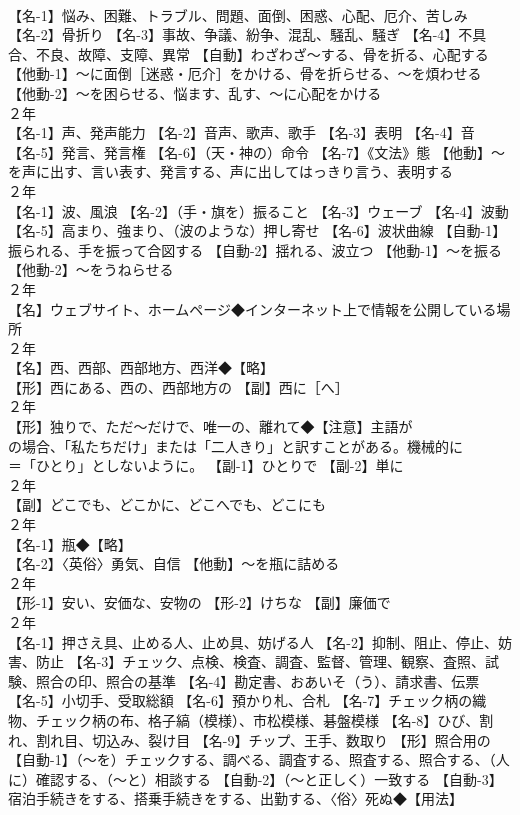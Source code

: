 \documentclass[8pt]{extreport}
\begin{document}
\begin{CJK}{UTF8}{min}
\\	【名-1】悩み、困難、トラブル、問題、面倒、困惑、心配、厄介、苦しみ 【名-2】骨折り 【名-3】事故、争議、紛争、混乱、騒乱、騒ぎ 【名-4】不具合、不良、故障、支障、異常 【自動】わざわざ～する、骨を折る、心配する 【他動-1】～に面倒［迷惑・厄介］をかける、骨を折らせる、～を煩わせる 【他動-2】～を困らせる、悩ます、乱す、～に心配をかける
\\	２年	
\\	【名-1】声、発声能力 【名-2】音声、歌声、歌手 【名-3】表明 【名-4】音 【名-5】発言、発言権 【名-6】（天・神の）命令 【名-7】《文法》態 【他動】～を声に出す、言い表す、発言する、声に出してはっきり言う、表明する
\\	２年	
\\	【名-1】波、風浪 【名-2】（手・旗を）振ること 【名-3】ウェーブ 【名-4】波動 【名-5】高まり、強まり、（波のような）押し寄せ 【名-6】波状曲線 【自動-1】振られる、手を振って合図する 【自動-2】揺れる、波立つ 【他動-1】～を振る 【他動-2】～をうねらせる
\\	２年	
\\	【名】ウェブサイト、ホームページ◆インターネット上で情報を公開している場所
\\	２年	
\\	【名】西、西部、西部地方、西洋◆【略】
\\	【形】西にある、西の、西部地方の 【副】西に［へ］
\\	２年	
\\	【形】独りで、ただ～だけで、唯一の、離れて◆【注意】主語が 
\\	の場合、「私たちだけ」または「二人きり」と訳すことがある。機械的に 
\\	＝「ひとり」としないように。 【副-1】ひとりで 【副-2】単に
\\	２年	
\\	【副】どこでも、どこかに、どこへでも、どこにも
\\	２年	
\\	【名-1】瓶◆【略】
\\	【名-2】〈英俗〉勇気、自信 【他動】～を瓶に詰める
\\	２年	
\\	【形-1】安い、安価な、安物の 【形-2】けちな 【副】廉価で
\\	２年	
\\	【名-1】押さえ具、止める人、止め具、妨げる人 【名-2】抑制、阻止、停止、妨害、防止 【名-3】チェック、点検、検査、調査、監督、管理、観察、査照、試験、照合の印、照合の基準 【名-4】勘定書、おあいそ（う）、請求書、伝票 【名-5】小切手、受取総額 【名-6】預かり札、合札 【名-7】チェック柄の織物、チェック柄の布、格子縞（模様）、市松模様、碁盤模様 【名-8】ひび、割れ、割れ目、切込み、裂け目 【名-9】チップ、王手、数取り 【形】照合用の 【自動-1】（～を）チェックする、調べる、調査する、照査する、照合する、（人に）確認する、（～と）相談する 【自動-2】（～と正しく）一致する 【自動-3】宿泊手続きをする、搭乗手続きをする、出勤する、〈俗〉死ぬ◆【用法】

\end{CJK}
\end{document}
